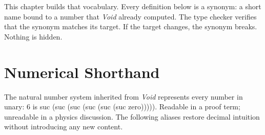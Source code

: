 \documentclass[11pt,a4paper]{book}
\def\texttt#1{#1}%
\begin{document}
This chapter builds that vocabulary. Every definition below is a synonym: a short name bound to a number that \textit{Void} already computed. The type checker verifies that the synonym matches its target. If the target changes, the synonym breaks. Nothing is hidden.

\section{Numerical Shorthand}

The natural number system inherited from \textit{Void} represents every number in unary: $6$ is \texttt{suc (suc (suc (suc (suc (suc zero)))))}. Readable in a proof term; unreadable in a physics discussion. The following aliases restore decimal intuition without introducing any new content.
\end{document}

